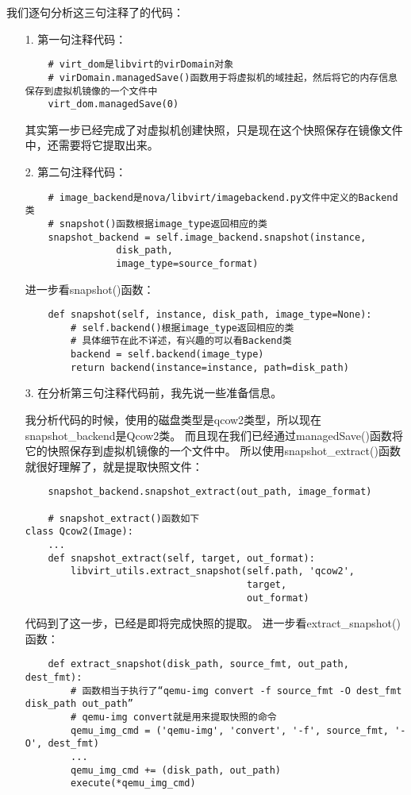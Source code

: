 \documentclass[a4paper,left=1.5cm,right=1.5cm,11pt]{article}
\begin{document}
	我们逐句分析这三句注释了的代码：
	\begin{itemize}
		\item[1.] 第一句注释代码：
		\begin{lstlisting}
	# virt_dom是libvirt的virDomain对象
	# virDomain.managedSave()函数用于将虚拟机的域挂起，然后将它的内存信息保存到虚拟机镜像的一个文件中
	virt_dom.managedSave(0)
		\end{lstlisting}

		其实第一步已经完成了对虚拟机创建快照，只是现在这个快照保存在镜像文件中，还需要将它提取出来。

		\item[2.] 第二句注释代码：
		\begin{lstlisting}
	# image_backend是nova/libvirt/imagebackend.py文件中定义的Backend类
	# snapshot()函数根据image_type返回相应的类
	snapshot_backend = self.image_backend.snapshot(instance,
                disk_path,
                image_type=source_format)
		\end{lstlisting}

		进一步看snapshot()函数：
		\begin{lstlisting}
	def snapshot(self, instance, disk_path, image_type=None):
		# self.backend()根据image_type返回相应的类
		# 具体细节在此不详述，有兴趣的可以看Backend类
        backend = self.backend(image_type)
        return backend(instance=instance, path=disk_path)
		\end{lstlisting}

		\item[3.] 在分析第三句注释代码前，我先说一些准备信息。\par
		我分析代码的时候，使用的磁盘类型是qcow2类型，所以现在snapshot\_backend是Qcow2类。
		而且现在我们已经通过managedSave()函数将它的快照保存到虚拟机镜像的一个文件中。
		所以使用snapshot\_extract()函数就很好理解了，就是提取快照文件：
		\begin{lstlisting}
	snapshot_backend.snapshot_extract(out_path, image_format)

	# snapshot_extract()函数如下
class Qcow2(Image):
	...
	def snapshot_extract(self, target, out_format):
        libvirt_utils.extract_snapshot(self.path, 'qcow2',
                                       target,
                                       out_format)
		\end{lstlisting}

\clearpage

		代码到了这一步，已经是即将完成快照的提取。
		进一步看extract\_snapshot()函数：
		\begin{lstlisting}
	def extract_snapshot(disk_path, source_fmt, out_path, dest_fmt):
		# 函数相当于执行了“qemu-img convert -f source_fmt -O dest_fmt disk_path out_path”
		# qemu-img convert就是用来提取快照的命令
		qemu_img_cmd = ('qemu-img', 'convert', '-f', source_fmt, '-O', dest_fmt)
		...
		qemu_img_cmd += (disk_path, out_path)
		execute(*qemu_img_cmd)
		\end{lstlisting}
	\end{itemize}
\end{document}
